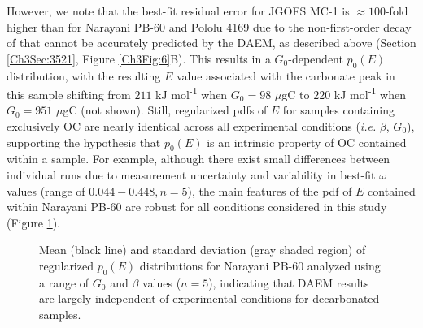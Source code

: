 However, we note that the best-fit residual error for JGOFS MC-1 is $\approx 100$-fold higher than for Narayani PB-60 and Pololu 4169 due to the non-first-order decay of  that cannot be accurately predicted by the DAEM, as described above (Section \ref{Ch3Sec:3521}, Figure \ref{Ch3Fig:6}B). This results in a $G_{0}$-dependent $p_{0}(E)$ distribution, with the resulting $E$ value associated with the carbonate peak in this sample shifting from $211$ kJ mol\textsuperscript{-1} when $G_{0}=98$ $\mu$gC to $220$ kJ mol\textsuperscript{-1} when $G_{0}=951$ $\mu$gC (not shown). Still, regularized pdfs of $E$ for samples containing exclusively OC are nearly identical across all experimental conditions (\textit{i.e.} $\beta$, $G_{0}$), supporting the hypothesis that $p_{0}(E)$ is an intrinsic property of OC contained within a sample. For example, although there exist small differences between individual runs due to measurement uncertainty and variability in best-fit $\omega$ values (range of $0.044 - 0.448, n=5$), the main features of the pdf of $E$ contained within Narayani PB-60 are robust for all conditions considered in this study (Figure \ref{Ch3Fig:7}). 

\begin{figure}[t]
	\caption[Average Narayani PB-60 $p_{0}(E)$ distribution for all experimental conditions]{Mean (black line) and standard deviation (gray shaded region) of regularized $p_{0}(E)$ distributions for Narayani PB-60 analyzed using a range of $G_{0}$ and $\beta$ values ($n = 5$), indicating that DAEM results are largely independent of experimental conditions for decarbonated samples.}
	\label{Ch3Fig:7} 
\end{figure}

